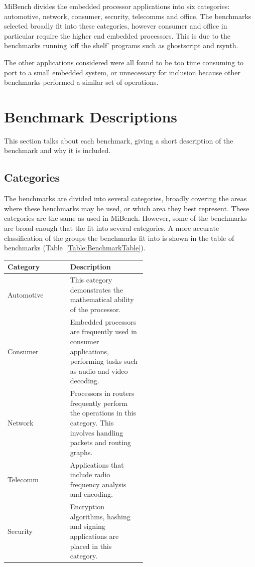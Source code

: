 \documentclass[twocolumn]{article}
\begin{document}
MiBench divides the embedded processor applications into six categories: automotive, network, consumer, security, telecomms and office. The benchmarks selected broadly fit into these categories, however consumer and office in particular require the higher end embedded processors. This is due to the benchmarks running `off the shelf' programs such as ghostscript and rsynth.

The other applications considered were all found to be too time consuming to port to a small embedded system, or unnecessary for inclusion because other benchmarks performed a similar set of operations.


\section{Benchmark Descriptions}

This section talks about each benchmark, giving a short description of the benchmark and why it is included.

\subsection*{Categories}

The benchmarks are divided into several categories, broadly covering the areas where these benchmarks may be used, or which area they best represent. These categories are the same as used in MiBench. However, some of the benchmarks are broad enough that the fit into several categories. A more accurate classification of the groups the benchmarks fit into is shown in the table of benchmarks (Table~\ref{Table:BenchmarkTable}).

\begin{center}
	\begin{tabular}{l p{0.55\linewidth}}
		Category &	Description \\
		\hline
		Automotive 	& This category demonstrates the mathematical ability of the processor. \\
		Consumer	& Embedded processors are frequently used in consumer applications, performing tasks such as audio and video decoding. \\
		Network		& Processors in routers frequently perform the operations in this category. This involves handling packets and routing graphs. \\
		Telecomm	& Applications that include radio frequency analysis and encoding. \\
		Security	& Encryption algorithms, hashing and signing applications are placed in this category. \\
	\end{tabular}
\end{center}
\end{document}
